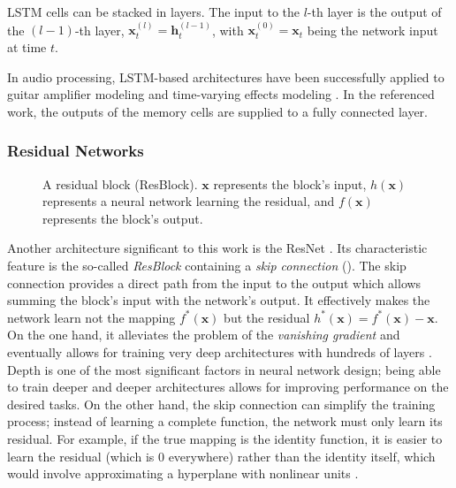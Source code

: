 \ac{LSTM} cells can be stacked in layers. The input to the $l$-th layer is the output of the $(l-1)$-th layer, $\pmb{x}_t^{(l)} = \pmb{h}_t^{(l-1)}$, with $\pmb{x}_t^{(0)} = \pmb{x}_t$ being the network input at time $t$.

In audio processing, \ac{LSTM}-based architectures have been successfully applied to guitar amplifier modeling \cite{Wright2019,Wrightetal2020} and time-varying effects modeling \cite{Wright2020}. In the referenced work, the outputs of the memory cells are supplied to a fully connected layer.

\subsubsection{Residual Networks}

\begin{figure}
  \centering
  
  \caption{A residual block (ResBlock). $\pmb{x}$ represents the block's input, $h(\pmb{x})$ represents a neural network learning the residual, and $f(\pmb{x})$ represents the block's output.}
  \label{fig:resblock}
\end{figure}

Another architecture significant to this work is the \ac{ResNet} \cite{He2015}. Its characteristic feature is the so-called \emph{\ac{ResBlock}} containing a \emph{skip connection} (). The skip connection provides a direct path from the input to the output which allows summing the block's input with the network's output. It effectively makes the network learn not the mapping $f^*(\pmb{x})$ but the residual $h^*(\pmb{x}) = f^*(\pmb{x}) - \pmb{x}$. On the one hand, it alleviates the problem of the \emph{vanishing gradient} \cite{Goodfellow-et-al-2016} and eventually allows for training very deep architectures with hundreds of layers \cite{He2015}. Depth is one of the most significant factors in neural network design; being able to train deeper and deeper architectures allows for improving performance on the desired tasks. On the other hand, the skip connection can simplify the training process; instead of learning a complete function, the network must only learn its residual. For example, if the true mapping is the identity function, it is easier to learn the residual (which is $0$ everywhere) rather than the identity itself, which would involve approximating a hyperplane with nonlinear units \cite{He2015}.

